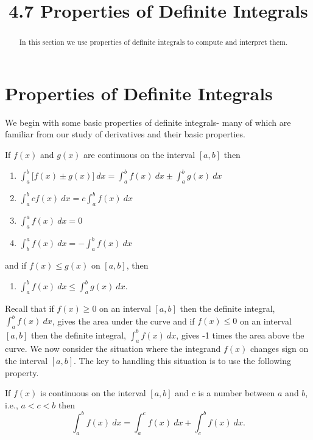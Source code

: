 \documentclass{ximera}
\title{4.7 Properties of Definite Integrals}
\begin{document}
\begin{abstract}
In this section we use properties of definite integrals to compute and interpret them.
\end{abstract}

\maketitle



\section{Properties of Definite Integrals}

We begin with some basic properties of definite integrals- many of which are familiar from our study of derivatives and their basic properties.

\begin{proposition}
If $f(x)$ and $g(x)$ are continuous on the interval $[a,b]$ then 
\begin{enumerate}
\item $\displaystyle{\int_a^b \Big[f(x) \pm g(x) \Big] \ dx = \int_a^b f(x) \ dx \pm \int_a^b g(x) \ dx}$
\item $\displaystyle{\int_a^b cf(x) \ dx = c\int_a^b f(x) \ dx}$
\item $\displaystyle{\int_a^a f(x) \ dx = 0}$
\item $\displaystyle{\int_b^a f(x) \ dx = -\int_a^b f(x) \ dx}$\\
\end{enumerate}
and if $f(x) \leq g(x)$ on $[a,b]$, then
\begin{enumerate}[resume]
\item $\displaystyle{\int_a^b f(x) \ dx \leq \int_a^b g(x) \ dx.}$
\end{enumerate}
\end{proposition}

Recall that if $f(x) \geq 0$ on an interval $[a, b]$ then the definite integral, $\int_a^b f(x) \ dx$,
gives the area under the curve and if $f(x) \leq 0$ on an interval $[a, b]$ then 
the definite integral, $\int_a^b f(x) \ dx$, gives -1 times the area above the curve. 
We now consider the situation where the integrand $f(x)$ changes sign on the interval $[a,b]$.
The key to handling this situation is to use the following property.
\begin{proposition}[Additivity]
If $f(x)$ is continuous on the interval $[a,b]$ and $c$ is a number between $a$ and $b$, i.e., $a<c<b$ then
\[\int_a^b f(x) \ dx = \int_a^c f(x) \ dx  + \int_c^b f(x) \ dx.\]
\end{proposition}
\end{document}
